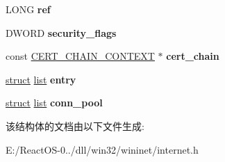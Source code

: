 \begin{DoxyCompactItemize}
\item 
\mbox{\label{structserver__t_adc607c6ef45c6834266a6d3a9406de54}} 
L\+O\+NG {\bfseries ref}
\item 
\mbox{\label{structserver__t_a50b55c7bf9b99237814416c62d8def72}} 
D\+W\+O\+RD {\bfseries security\+\_\+flags}
\item 
\mbox{\label{structserver__t_a4dc8577969e5e1414cf0158b867143e1}} 
const \hyperlink{struct___c_e_r_t___c_h_a_i_n___c_o_n_t_e_x_t}{C\+E\+R\+T\+\_\+\+C\+H\+A\+I\+N\+\_\+\+C\+O\+N\+T\+E\+XT} $\ast$ {\bfseries cert\+\_\+chain}
\item 
\mbox{\label{structserver__t_a9de5aecc01bb51bd5b79cb4a813ce68e}} 
\hyperlink{interfacestruct}{struct} \hyperlink{classlist}{list} {\bfseries entry}
\item 
\mbox{\label{structserver__t_aafd3e6fc6a2458d920fd23db37982af7}} 
\hyperlink{interfacestruct}{struct} \hyperlink{classlist}{list} {\bfseries conn\+\_\+pool}
\end{DoxyCompactItemize}


该结构体的文档由以下文件生成\+:\begin{DoxyCompactItemize}
\item 
E\+:/\+React\+O\+S-\/0../dll/win32/wininet/internet.\+h\end{DoxyCompactItemize}
